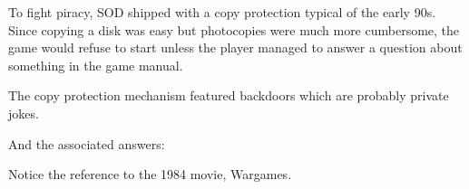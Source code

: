 \documentclass[book.tex]{subfiles}
\begin{document}
   \par
\begin{figure}[H]
\centering
 \end{figure}
 \par

To fight piracy, SOD shipped with a copy protection typical of the early 90s. Since copying a disk was easy but photocopies were much more cumbersome, the game would refuse to start unless the player managed to answer a question about something in the game manual.\\
    \par
\begin{figure}[H]
\centering
 \end{figure}
 \par
 The copy protection mechanism featured backdoors which are probably private jokes.
\par
\begin{minipage}{\textwidth}

\end{minipage}
\par
And the associated answers:\\
\par
\begin{minipage}{\textwidth}

\end{minipage}
\par
Notice the reference to the 1984 movie, Wargames.
    \par
\begin{figure}[H]
\centering
 \end{figure}
 \par
\end{document}

